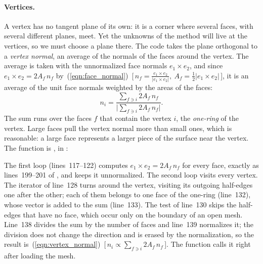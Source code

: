 \paragraph{Vertices.} A vertex has no tangent plane of its own: it is a corner where several faces, with several different planes, meet. Yet the unknowns of the method will live at the vertices, so we must choose a plane there. The code takes the plane orthogonal to a \emph{vertex normal}, an average of the normals of the faces around the vertex. The average is taken with the unnormalized face normals $e_1 \times e_2$, and since $e_1 \times e_2 = 2 A_f\, n_f$ by~(\ref{eqn:face_normal})~[\,$n_f = \frac{e_1\times e_2}{|e_1\times e_2|},\ A_f = \tfrac12|e_1\times e_2|$\,], it is an average of the unit face normals weighted by the areas of the faces:
\begin{equation}
\label{eqn:vertex_normal}
n_i = \frac{\sum_{f \ni i} 2 A_f\, n_f}{\big|\sum_{f \ni i} 2 A_f\, n_f\big|}.
\end{equation}
The sum runs over the faces $f$ that contain the vertex $i$, the \emph{one-ring} of the vertex. Large faces pull the vertex normal more than small ones, which is reasonable: a large face represents a larger piece of the surface near the vertex. The function is , in :

The first loop (lines~117--122) computes $e_1 \times e_2 = 2A_f\, n_f$ for every face, exactly as lines~199--201 of , and keeps it unnormalized. The second loop visits every vertex. The iterator of line~128 turns around the vertex, visiting its outgoing half-edges one after the other; each of them belongs to one face of the one-ring (line~132), whose vector is added to the sum (line~133). The test of line~130 skips the half-edges that have no face, which occur only on the boundary of an open mesh. Line~138 divides the sum by the number of faces and line~139 normalizes it; the division does not change the direction and is erased by the normalization, so the result is~(\ref{eqn:vertex_normal})~[\,$n_i \propto \sum_{f\ni i} 2A_f\, n_f$\,]. The function  calls it right after loading the mesh.

